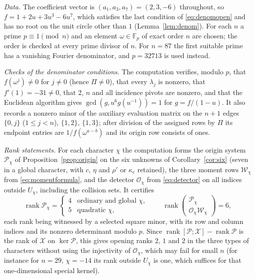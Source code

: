 \documentclass{amsart}
\theoremstyle{definition}
\theoremstyle{remark}
\numberwithin{equation}{section}
\DeclareMathOperator{\rank}{rank}
\begin{document}
\emph{Data.} The coefficient vector is $(a_1,a_3,a_7)=(2,3,-6)$ throughout, so
$f=1+2u+3u^3-6u^7$, which satisfies the last condition of \eqref{eq:denomopen} and has no
root on the unit circle other than $1$ (Lemma~\ref{lem:denom}). For each $n$ a prime
$p\equiv1\pmod n$ and an element $\omega\in\mathbb F_p$ of exact order $n$ are chosen; the
order is checked at every prime divisor of $n$. For $n=87$ the first suitable prime has a
vanishing Fourier denominator, and $p=32713$ is used instead.

\emph{Checks of the denominator conditions.} The computation verifies, modulo $p$, that
$f(\omega^j)\ne0$ for $j\ne0$ (hence $\Pi\ne0$), that every $\lambda_j$ is nonzero, that
$f'(1)=-31\ne0$, that $2$, $n$ and all incidence pivots are nonzero, and that the Euclidean
algorithm gives $\gcd(g,u^6g(u^{-1}))=1$ for $g=f/(1-u)$. It also records a nonzero minor of
the auxiliary evaluation matrix on the $n+1$ edges $\{0,j\}$ ($1\le j<n$), $\{1,2\}$,
$\{1,3\}$; after division of the assigned rows by $\Pi$ its endpoint entries are
$1/f(\omega^{a-b})$ and its origin row consists of ones.

\emph{Rank statements.} For each character $\chi$ the computation forms the origin system
$\mathcal P_\chi$ of Proposition~\ref{prop:origin} on the six unknowns of
Corollary~\ref{cor:six} (seven in a global character, with $c$, $\eta$ and $\rho'$ or
$\kappa_e$ retained), the three moment rows $\mathcal W_\chi$ from
\eqref{eq:momentformula}, and the detector $\mathcal O_\chi$ from \eqref{eq:detector} on all
indices outside $U_\chi$, including the collision sets. It certifies
\[
  \rank\mathcal P_\chi=\begin{cases}4&\text{ordinary and global }\chi,\\
  5&\text{quadratic }\chi,\end{cases}\qquad
  \rank\begin{pmatrix}\mathcal P_\chi\\\mathcal O_\chi\mathcal W_\chi\end{pmatrix}=6,
\]
each rank being witnessed by a selected square minor, with its row and column indices and
its nonzero determinant modulo $p$. Since
$\rank[\mathcal P;\mathcal X]-\rank\mathcal P$
is the rank of $\mathcal X$ on $\ker\mathcal P$, this gives opening ranks $2$, $1$ and $2$ in
the three types of characters without using the injectivity of $\mathcal O_\chi$, which may
fail for small $n$ (for instance for $n=29$, $\chi=-14$ its rank outside $U_\chi$ is one,
which suffices for that one-dimensional special kernel).
\end{document}
